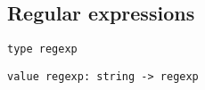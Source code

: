 
\label{s:str}
%

\subsection*{Regular expressions }\begin{verbatim}
type regexp
\end{verbatim}
\begin{comment}
 The type of compiled regular expressions. 
\end{comment}
\begin{verbatim}
value regexp: string -> regexp
\end{verbatim}
%
\begin{comment}
 Compile a regular expression. The syntax for regular expressions
           is the same as in Gnu Emacs. The special characters are
           \verb$^.*+?[]\. The following constructs are recognized:
\\[\smallskipamount]          \verb.      matches any character except newline
\\[\smallskipamount]          \verb*      (postfix) matches the previous expression zero, one or
                    several times
\\[\smallskipamount]          \verb-      (postfix) matches the previous expression one or
                    several times
\\[\smallskipamount]          \verb?      (postfix) matches the previous expression once or
                    not at all
\\[\smallskipamount]          \verb[..]   character set; ranges are denoted with \verb-, as in \verba-z;
                    an initial \verb^, as in \verb^0-9, complements the set
\\[\smallskipamount]          \verb^      matches at beginning of line
\\[\smallskipamount]          \verb$      matches at end of line
\\[\smallskipamount]          \verb\|     (infix) alternative between two expressions
\\[\smallskipamount]          \verb\(..\) grouping and naming of the enclosed expression
\\[\smallskipamount]          \verb\1     the text matched by the first \verb\(...\) expression
                    (\verb\2 for the second expression, etc)
\\[\smallskipamount]          \verb\b     matches word boundaries
\\[\smallskipamount]          \verb\^, \$ quotes special characters. 
\end{comment}
